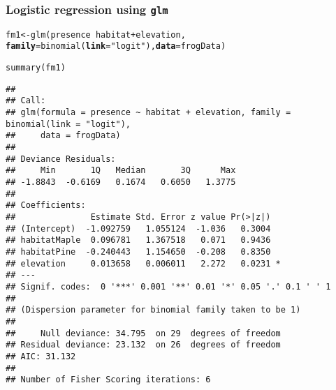 \documentclass[color=usenames,dvipsnames]{beamer}\usepackage[]{graphicx}\usepackage[]{color}
\makeatletter
\newcommand{\hlstr}[1]{\textcolor[rgb]{0.749,0.012,0.012}{#1}}%
\newcommand{\hlopt}[1]{\textcolor[rgb]{0,0,0}{#1}}%
\newcommand{\hlstd}[1]{\textcolor[rgb]{0,0,0}{#1}}%
\newcommand{\hlkwb}[1]{\textcolor[rgb]{0,0.341,0.682}{#1}}%
\newcommand{\hlkwc}[1]{\textcolor[rgb]{0,0,0}{\textbf{#1}}}%
\newcommand{\hlkwd}[1]{\textcolor[rgb]{0.004,0.004,0.506}{#1}}%
\newenvironment{kframe}{%
 \def\at@end@of@kframe{}%
 \ifinner\ifhmode%
  \def\at@end@of@kframe{\end{minipage}}%
  \begin{minipage}{\columnwidth}%
 \fi\fi%
 \def\FrameCommand##1{\hskip\@totalleftmargin \hskip-\fboxsep
 \colorbox{shadecolor}{##1}\hskip-\fboxsep
     \hskip-\linewidth \hskip-\@totalleftmargin \hskip\columnwidth}%
 \MakeFramed {\advance\hsize-\width
   \@totalleftmargin\z@ \linewidth\hsize
   \@setminipage}}%
 {\par\unskip\endMakeFramed%
 \at@end@of@kframe}
\newenvironment{knitrout}{}{} %
\makeatother
\begin{document}
\begin{frame}[fragile]
  \frametitle{Logistic regression using {\tt glm}}
\begin{knitrout}\tiny
{}\color{fgcolor}\begin{kframe}
\begin{alltt}
\hlstd{fm1} \hlkwb{<-} \hlkwd{glm}\hlstd{(presence} \hlopt{~} \hlstd{habitat} \hlopt{+} \hlstd{elevation,}
           \hlkwc{family}\hlstd{=}\hlkwd{binomial}\hlstd{(}\hlkwc{link}\hlstd{=}\hlstr{"logit"}\hlstd{),} \hlkwc{data}\hlstd{=frogData)}
\end{alltt}
\end{kframe}
\end{knitrout}
\pause
\begin{knitrout}\tiny
{}\color{fgcolor}\begin{kframe}
\begin{alltt}
\hlkwd{summary}\hlstd{(fm1)}
\end{alltt}
\begin{verbatim}
## 
## Call:
## glm(formula = presence ~ habitat + elevation, family = binomial(link = "logit"), 
##     data = frogData)
## 
## Deviance Residuals: 
##     Min       1Q   Median       3Q      Max  
## -1.8843  -0.6169   0.1674   0.6050   1.3775  
## 
## Coefficients:
##               Estimate Std. Error z value Pr(>|z|)  
## (Intercept)  -1.092759   1.055124  -1.036   0.3004  
## habitatMaple  0.096781   1.367518   0.071   0.9436  
## habitatPine  -0.240443   1.154650  -0.208   0.8350  
## elevation     0.013658   0.006011   2.272   0.0231 *
## ---
## Signif. codes:  0 '***' 0.001 '**' 0.01 '*' 0.05 '.' 0.1 ' ' 1
## 
## (Dispersion parameter for binomial family taken to be 1)
## 
##     Null deviance: 34.795  on 29  degrees of freedom
## Residual deviance: 23.132  on 26  degrees of freedom
## AIC: 31.132
## 
## Number of Fisher Scoring iterations: 6
\end{verbatim}
\end{kframe}
\end{knitrout}
\end{frame}


\end{document}
